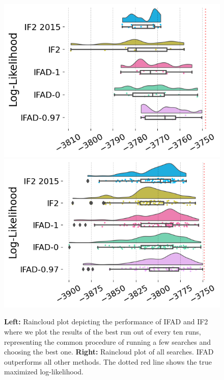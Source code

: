 \documentclass[9pt,twocolumn,pnasresearcharticle]{pnas-new}
\newcommand\arxiv[2]{#2} %
\begin{document}

  
\begin{figure}[ht]
    \includegraphics[width=\arxiv{8cm}{\textwidth/\real{4.2}}]{imgs/095/boxplot.png}
    \includegraphics[width=\arxiv{8cm}{\textwidth/\real{4.2}}]{imgs/095/boxplot_all.png}
    \caption{\textbf{Left:} Raincloud plot depicting the performance of IFAD and IF2 where we plot the results of the best run out of every ten runs, representing the common procedure of running a few searches and choosing the best one. \textbf{Right:} Raincloud plot of all searches. IFAD outperforms all other methods.
    The dotted red line shows the true maximized log-likelihood.}
    \label{fig:boxplot}
    \arxiv{}{\vspace*{-5mm}}
\end{figure}
\end{document}
